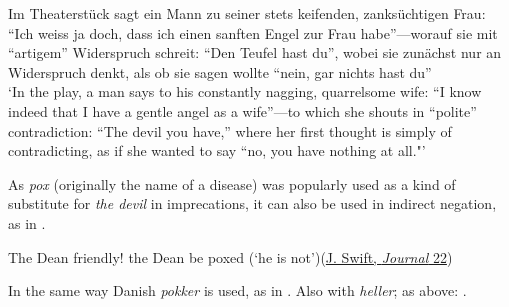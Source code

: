\ex
Im Theaterstück sagt ein Mann zu seiner stets keifenden, zanksüchtigen Frau: ``Ich weiss {ja doch}, dass ich einen sanften Engel zur Frau habe''---worauf sie mit ``artigem'' Widerspruch schreit: ``Den Teufel hast du'', wobei sie zunächst nur an Widerspruch denkt, als ob sie sagen wollte ``nein, gar nichts hast du''\\
`In the play, a man says to his constantly nagging, quarrelsome wife: ``I know indeed that I have a gentle angel as a wife''---to which she shouts in ``polite'' contradiction: ``The devil you have,'' where her first thought is simply of contradicting, as if she wanted to say ``no, you have nothing at all."'
\hfill\citep[\href{https://archive.org/details/psychologische-studien-zur-sprachgeschic/page/172/mode/2up\&view=theater}{172}]{bruchmann1888psychologische} %
\z\z

As \textit{pox} (originally the name of a disease) was popularly used as a kind of substitute for \textit{the devil} in imprecations, it can also be used in indirect negation, as in .

\ea \label{ex:04-228}
The Dean friendly! the Dean be poxed \phantom{x} (`he is not')\hfill(\href{https://archive.org/details/journaltostellae00swifuoft/page/22/mode/2up?q=\%22dean+be+poxed\%22&view=theater}{J. Swift, \textit{Journal} 22})
\z

In the same way Danish \textit{pokker} is used, as in . Also with \textit{heller}; as above: .

